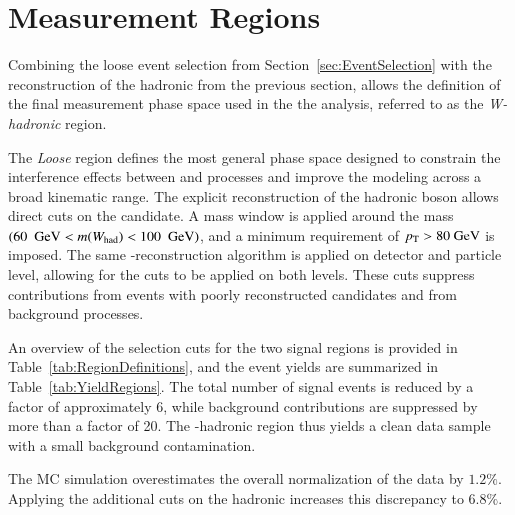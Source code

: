\section{Measurement Regions}%
\label{sec:Regions}

Combining the loose event selection from Section~\ref{sec:EventSelection} with the reconstruction of the hadronic \Wboson from the previous section, allows the definition of the final measurement phase space used in the the analysis, referred to as the \textit{W-hadronic} region.

The \textit{Loose} region defines the most general phase space designed to constrain the interference
effects between \ttbar and \tW processes and improve the modeling across a broad kinematic range.
The explicit reconstruction of the hadronic \Wboson boson allows 
direct cuts on the \Wboson candidate.
A mass window is applied around the \Wboson mass $(60~~\text{GeV} < m(W_\mathrm{had}) < 100~~\text{GeV})$,
and a minimum \pt requirement of $p_{\text{T}} > 80 ~\text{GeV}$ is imposed.
The same \Wboson-reconstruction algorithm is applied on detector and particle level, allowing for the cuts to be applied on both levels.
These cuts suppress contributions from events with poorly reconstructed \Wboson candidates and from background processes.

An overview of the selection cuts for the two signal regions is provided in Table~\ref{tab:RegionDefinitions}, and the event yields are summarized in Table~\ref{tab:YieldRegions}. The total number of signal events is reduced by a factor of approximately 6, while background contributions are suppressed by more than a factor of 20. The \Wboson-hadronic region thus yields a clean data sample with a small background contamination.

The MC simulation overestimates the overall normalization of the data by $1.2\%$.
Applying the additional cuts on the hadronic \Wboson increases this discrepancy to $6.8\%$.

